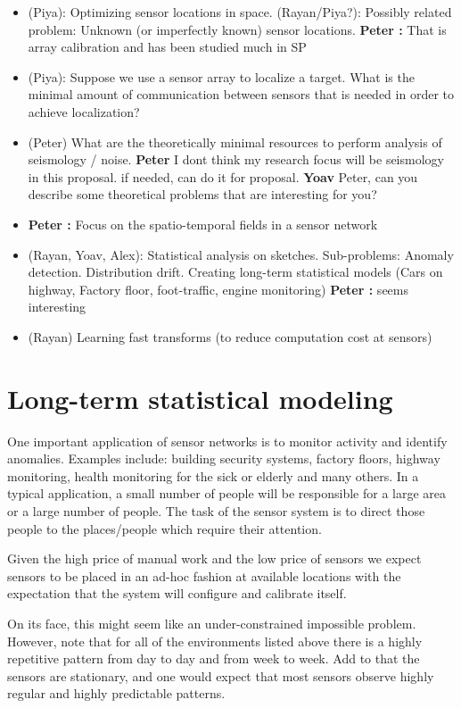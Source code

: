 \documentclass{article}
\newcommand{\comment}[3]{{\color{#1} {\bf #2 :} #3}}
\newcommand{\peter}[1]{\comment{purple}{Peter}{#1}}
\begin{document}
\begin{itemize}
    \item (Piya): Optimizing sensor locations in space. (Rayan/Piya?): Possibly related problem: Unknown (or imperfectly known) sensor locations. {\peter That is array calibration and has been studied much in SP}
    \item (Piya): Suppose we use a sensor array to localize a target. What is the minimal amount of communication between sensors that is needed in order to achieve localization?
    \item (Peter) What are the theoretically minimal resources to perform analysis of seismology / noise. {\bf Peter} I dont think my research focus will be seismology in this proposal. if needed, can do it for proposal. {\bf Yoav} Peter, can you describe some theoretical problems that are interesting for you?
    \item {\peter Focus on the spatio-temporal fields in a  sensor network}
    \item (Rayan, Yoav, Alex): Statistical analysis on sketches. Sub-problems: Anomaly detection. Distribution drift. Creating long-term statistical models (Cars on highway, Factory floor, foot-traffic, engine monitoring){\peter seems interesting}
    \item (Rayan) Learning fast transforms (to reduce computation cost at sensors) 
\end{itemize}
\fi

\section{Long-term statistical modeling}
 One important application of sensor networks is to monitor activity and identify anomalies. Examples include: building security systems, factory floors, highway monitoring, health monitoring for the sick or elderly and many others. In a typical application, a small number of people will be responsible for a large area or a large number of people. The task of the sensor system is to direct those people to the places/people which require their attention. 
 
 Given the high price of manual work and the low price of sensors we expect sensors to be placed in an ad-hoc fashion at available locations with the expectation that the system will configure and calibrate itself.
 
 On its face, this might seem like an under-constrained impossible problem. However, note that for all of the environments listed above there is a highly repetitive pattern from day to day and from week to week. Add to that the sensors are stationary, and one would expect that most sensors observe highly regular and highly predictable patterns.
 
\end{document}
